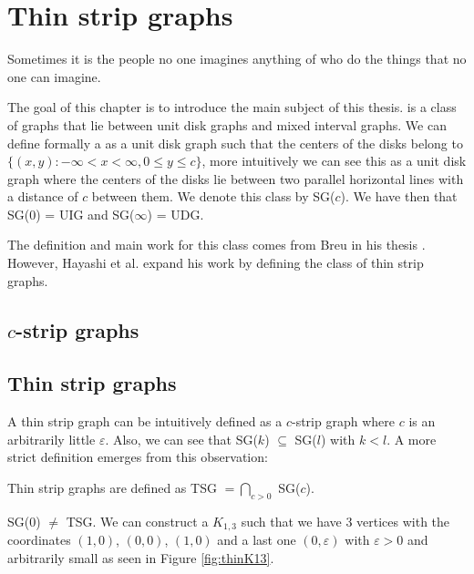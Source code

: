 \chapter{Thin strip graphs}
\label{chap:thinDef}

\begin{fquote}
  Sometimes it is the people no one imagines anything of who do the things that no one can imagine.
\end{fquote}

The goal of this chapter is to introduce the main subject of this thesis. \emph{} is a class of graphs that lie between unit disk graphs
and mixed interval graphs. We can define formally a \emph{} as a unit disk graph such that the centers of the disks belong to $\{(x,y) : -\infty < x < \infty, 0 \leq y \leq c\}$, more intuitively we can see this as a unit disk graph where the centers of the disks lie between two parallel horizontal lines with a distance of $c$ between them. We denote this class by SG($c$). We have then that SG($0$) = UIG and SG($\infty$) = UDG.

The definition and main work for this class comes from Breu in his thesis \cite{breuAlgorithmicAspectsConstrained1996}. However, Hayashi et al. \cite{hayashiThinStripGraphs2017} expand his work by defining the class of thin strip graphs.

\section{$c$-strip graphs}

\section{Thin strip graphs}

A thin strip graph can be intuitively defined as a $c$-strip graph where $c$ is an arbitrarily little $\varepsilon$. Also, we can see that SG($k$) $\subseteq$ SG($l$) with $k<l$. A more strict definition emerges from this observation:

\begin{defn}
  Thin strip graphs are defined as TSG $= \bigcap_{c > 0}$ SG($c$).
\end{defn}

\begin{remark}
  SG($0$) $\neq$ TSG. We can construct a $K_{1,3}$ such that we have 3 vertices with the coordinates
  $(1,0)$, $(0,0)$, $(1,0)$ and a last one $(0,\varepsilon)$ with $\varepsilon > 0$ and arbitrarily small
  as seen in Figure \ref{fig:thinK13}.
\end{remark}

